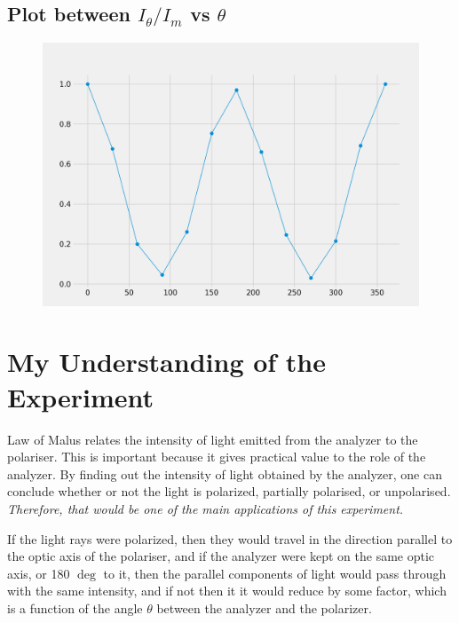 \documentclass[11pt]{article}
\begin{document}
\subsection{Plot between $I_\theta /I_m$ vs $\theta$}
\begin{figure}[H]
	\centering
	\includegraphics[scale=0.6]{plot_gg.png}
	\label{it}
\end{figure}

	\section{My Understanding of the Experiment}
	Law of Malus relates the intensity of light emitted from the analyzer to the polariser. This is important because it gives practical value to the role of the analyzer. By finding out the intensity of light obtained by the analyzer, one can conclude whether or not the light is polarized, partially polarised, or unpolarised. \textit{Therefore, that would be one of the main applications of this experiment. }
	
	If the light rays were polarized, then they would travel in the direction parallel to the optic axis of the polariser, and if the analyzer were kept on the same optic axis, or 180 $\deg$ to it, then the parallel components of light would pass through with the same intensity, and if not then it it would reduce by some factor, which is a function of the angle $\theta$ between the analyzer and the polarizer.
\end{document}
